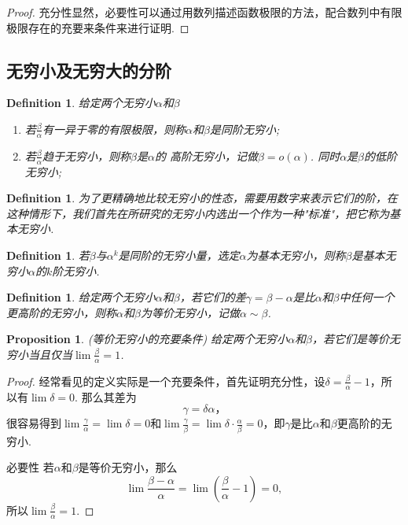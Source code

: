 \documentclass{article}
\newtheorem{proposition}[theorem]{Proposition}
\newtheorem{definition}[theorem]{Definition}
\begin{document}
\begin{proof}
{\color{blue}充分性显然，必要性可以通过用数列描述函数极限的方法，配合数列中有限极限存在的充要来条件来进行证明}.
\end{proof}

\subsection{无穷小及无穷大的分阶}


\begin{definition}
\rm 给定两个无穷小$\alpha$和$\beta$
\begin{enumerate}
	\item 若$\frac{\beta}{\alpha}$有一异于零的有限极限，则称$\alpha$和$\beta$是{\color{red}同阶无穷小};
	\item 若$\frac{\beta}{\alpha}$趋于无穷小，则称$\beta$是$\alpha$的{\color{red} 高阶无穷小}，记做$\beta = o(\alpha)$.
	同时$\alpha$是$\beta$的低阶无穷小;
\end{enumerate}
\end{definition}

\begin{definition}
\rm 为了更精确地比较无穷小的性态，需要用数字来表示它们的阶，在这种情形下，我们首先在所研究的无穷小内选出一个作为一种"标准"，把它称为{\color{red}基本无穷小}.
\end{definition}

\begin{definition}
\rm 若$\beta$与$\alpha^k$是同阶的无穷小量，选定$\alpha$为基本无穷小，则称$\beta$是基本无穷小$\alpha$的$k$阶无穷小.
\end{definition}

\begin{definition}
\rm 给定两个无穷小$\alpha$和$\beta$，若它们的差$\gamma = \beta - \alpha$是比$\alpha$和$\beta$中任何一个更高阶的无穷小，则称$\alpha$和$\beta$为{\color{red}等价无穷小}，记做$\alpha \sim \beta$.
\end{definition}

\begin{proposition}
\rm {\color{red} (等价无穷小的充要条件)} 给定两个无穷小$\alpha$和$\beta$，若它们是等价无穷小当且仅当$\lim \frac{\beta}{\alpha} = 1$.
\end{proposition}

\begin{proof}
经常看见的定义实际是一个充要条件，首先证明{\color{blue}充分性}，设$\delta = \frac{\beta}{\alpha} - 1$，所以有$\lim \delta = 0$. 那么其差为
$$
\gamma = \delta \alpha，
$$
很容易得到$\lim \frac{\gamma}{\alpha} =\lim \delta = 0$和$\lim \frac{\gamma}{\beta} = \lim \delta\cdot\frac{\alpha}{\beta} = 0$，即$\gamma$是比$\alpha$和$\beta$更高阶的无穷小.

{\color{blue}必要性} 若$\alpha$和$\beta$是等价无穷小，那么
$$
\lim \frac{\beta-\alpha}{\alpha} = \lim (\frac{\beta}{\alpha} - 1) = 0,
$$
所以$\lim \frac{\beta}{\alpha} = 1$.
\end{proof}
\end{document}
